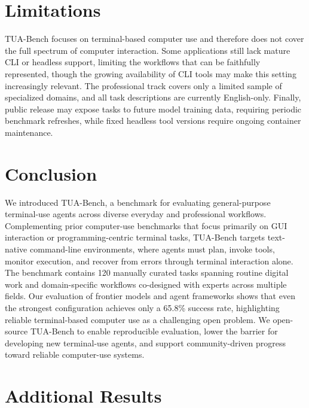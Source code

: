 \documentclass{llmxive}
\providecommand{\benchname}{\mbox{TUA-Bench}\xspace}
\providecommand{\beginappendix}{\appendix{\huge\sffamily Appendix\par}}
\begin{document}
\section{Limitations}\label{sec:limitations-detail}

\benchname focuses on terminal-based computer use and therefore does not cover the full spectrum of computer interaction. Some applications still lack mature CLI or headless support, limiting the workflows that can be faithfully represented, though the growing availability of CLI tools may make this setting increasingly relevant. The professional track covers only a limited sample of specialized domains, and all task descriptions are currently English-only. Finally, public release may expose tasks to future model training data, requiring periodic benchmark refreshes, while fixed headless tool versions require ongoing container maintenance.

\section{Conclusion}\label{sec:conclusion}

We introduced \benchname, a benchmark for evaluating general-purpose terminal-use agents across diverse everyday and professional workflows. Complementing prior computer-use benchmarks that focus primarily on GUI interaction or programming-centric terminal tasks, \benchname targets text-native command-line environments, where agents must plan, invoke tools, monitor execution, and recover from errors through terminal interaction alone. The benchmark contains 120 manually curated tasks spanning routine digital work and domain-specific workflows co-designed with experts across multiple fields. Our evaluation of frontier models and agent frameworks shows that even the strongest configuration achieves only a 65.8\% success rate, highlighting reliable terminal-based computer use as a challenging open problem. We open-source \benchname to enable reproducible evaluation, lower the barrier for developing new terminal-use agents, and support community-driven progress toward reliable computer-use systems.








\beginappendix
\section{Additional Results}
\end{document}
